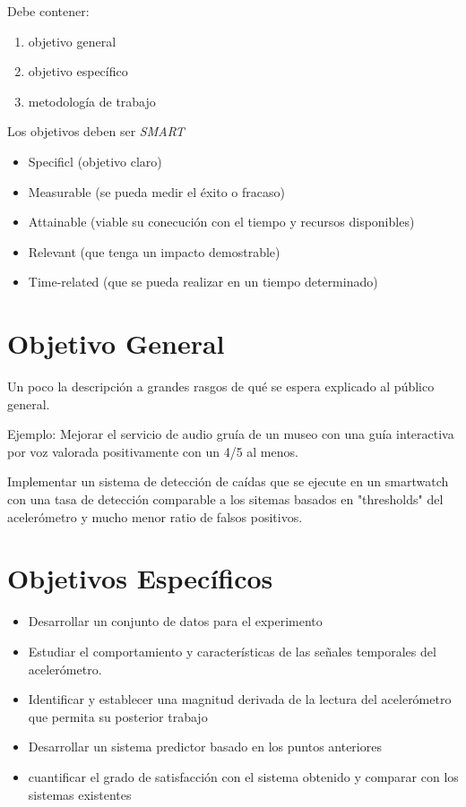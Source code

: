 \documentclass[../tfm.tex]{subfiles}
\begin{document}

Debe contener:
\begin{enumerate}
  \item objetivo general
  \item objetivo específico
  \item metodología de trabajo
\end{enumerate}

Los objetivos deben ser \textit{SMART}
\begin{itemize}
  \item Specificl (objetivo claro)
  \item Measurable (se pueda medir el éxito o fracaso)
  \item Attainable (viable su conecución con el tiempo y recursos disponibles)
  \item Relevant (que tenga un impacto demostrable)
  \item Time-related (que se pueda realizar en un tiempo determinado)
\end{itemize}


\section{Objetivo General}

Un poco la descripción a grandes rasgos de qué se espera explicado al público general.

Ejemplo: Mejorar el servicio de audio gruía de un museo con una guía interactiva por voz valorada positivamente con un 4/5 al menos.

Implementar un sistema de detección de caídas que se ejecute en un smartwatch con una tasa de detección comparable a los sitemas basados en "thresholds" del acelerómetro y mucho menor ratio de falsos positivos.

\section{Objetivos Específicos}
\begin{itemize}
  \item Desarrollar un conjunto de datos para el experimento
  \item Estudiar el comportamiento y características de las señales temporales del acelerómetro.
  \item Identificar y establecer una magnitud derivada de la lectura del acelerómetro que permita su posterior trabajo
  \item Desarrollar un sistema predictor basado en los puntos anteriores
  \item cuantificar el grado de satisfacción con el sistema obtenido y comparar con los sistemas existentes
\end{itemize}
\end{document}
